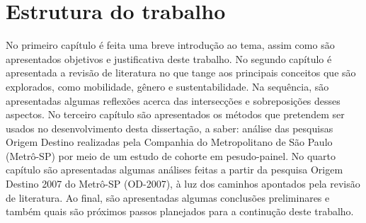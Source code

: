 \section{Estrutura do trabalho}

No primeiro capítulo é feita uma breve introdução ao tema, assim como são apresentados objetivos e justificativa deste trabalho.
No segundo capítulo é apresentada a revisão de literatura no que tange aos principais conceitos que são explorados, como mobilidade, gênero e sustentabilidade. Na sequência, são apresentadas algumas reflexões acerca das intersecções e sobreposições desses aspectos.
No terceiro capítulo são apresentados os métodos que pretendem ser usados no desenvolvimento desta dissertação, a saber: análise das pesquisas Origem Destino realizadas pela Companhia do Metropolitano de São Paulo (Metrô-SP) por meio de um estudo de cohorte em pesudo-painel.
No quarto capítulo são apresentadas algumas análises feitas a partir da pesquisa Origem Destino 2007 do Metrô-SP (OD-2007), à luz dos caminhos apontados pela revisão de literatura.
Ao final, são apresentadas algumas conclusões preliminares e também quais são próximos passos planejados para a continução deste trabalho.
